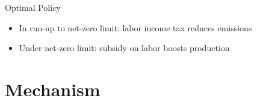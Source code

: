 \documentclass[11pt,aspectratio=169]{beamer}
\begin{document}
\begin{frame}{Optimal Policy}
\begin{figure}[h!!]
\begin{subfigure}{0.4\textwidth}
	\end{subfigure}
\end{figure}
\vspace{5mm}
\begin{block}{}
	\begin{itemize}
 \item In run-up to net-zero limit: labor income tax reduces emissions
 \item Under net-zero limit: subsidy on labor boosts production
	\end{itemize}
\end{block}	
\end{frame}

\section*{Mechanism}
\end{document}
